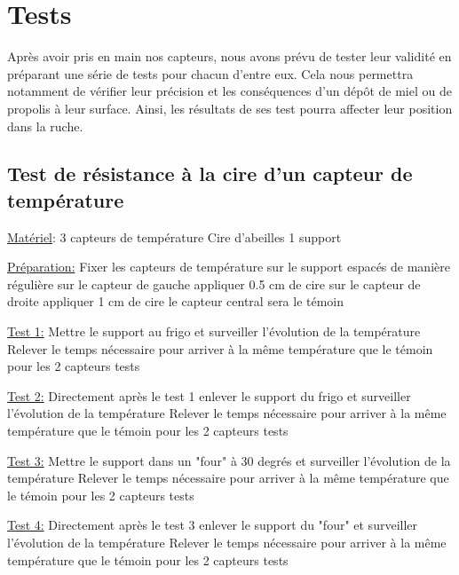 ﻿\chapter{Tests}

Après avoir pris en main nos capteurs, nous avons prévu de tester leur validité en préparant une série de tests pour chacun d'entre eux. Cela nous permettra notamment de vérifier leur précision et les conséquences d'un dépôt de miel ou de propolis à leur surface. Ainsi, les résultats de ses test pourra affecter leur position dans la ruche. 

\section{Test de résistance à la cire d'un capteur de température}

\noindent \underline{Matériel}:  
3 capteurs de température  
Cire d'abeilles  
1 support\newline  

\noindent \underline{Préparation:} \newline 
Fixer les capteurs de température sur le support espacés de manière régulière sur le capteur de gauche appliquer 0.5 cm de cire sur le capteur de droite appliquer 1 cm de cire le capteur central sera le témoin \newline

\noindent \underline{Test 1:} \newline 
Mettre le support au frigo et surveiller l'évolution de la température\newline   
Relever le temps nécessaire pour arriver à la même température que le témoin pour les 2 capteurs tests  

\noindent \underline{Test 2:}  \newline 
Directement après le test 1 enlever le support du frigo et surveiller l'évolution de la température\newline   
Relever le temps nécessaire pour arriver à la même température que le témoin pour les 2 capteurs tests

\noindent \underline{Test 3:}  \newline 
Mettre le support dans un "four" à 30 degrés et surveiller l'évolution de la température\newline   
Relever le temps nécessaire pour arriver à la même température que le témoin pour les 2 capteurs tests  
  
\noindent \underline{Test 4:}  \newline 
Directement après le test 3 enlever le support du "four" et surveiller l'évolution de la température\newline   
Relever le temps nécessaire pour arriver à la même température que le témoin pour les 2 capteurs tests



